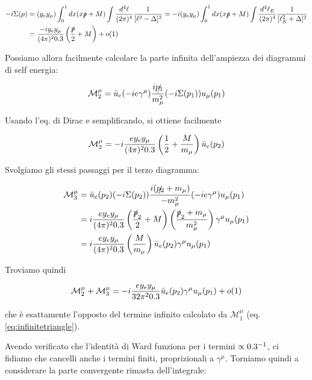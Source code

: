 \documentclass[11pt]{report}
\begin{document}
\begin{align}
    -i\Sigma(p) &= (y_e y_\mu)\int_0^1 dx (x\slashed{p} + M)\int \frac{d^4\ell}{(2\pi)^4}\frac{1}{[\ell^2 - \Delta]^2} = -i(y_e y_\mu) \int_0^1 dx (x\slashed{p} + M)\int \frac{d^4\ell_E}{(2\pi)^4}\frac{1}{[\ell_E^2 + \Delta]^2} \notag \\ 
    &= \frac{-iy_e y_\mu}{(4\pi)^20.3}\left(\frac{\slashed{p}}{2} +M \right) +o(1)
\end{align}

Possiamo allora facilmente calcolare la parte infinita dell'ampiezza dei diagrammi di self energia: 

\begin{align}
    \mathcal{M}_2^\mu = \bar{u}_e (-ie\gamma^\mu)\frac{i\slashed{p_1}}{m^2_\mu}(-i\Sigma(p_1))u_\mu (p_1)
\end{align}

Usando l'eq. di Dirac e semplificando, si ottiene facilmente 

\begin{align}
    \mathcal{M}_2^\mu = -i\frac{ey_e y_\mu}{(4\pi)^20.3}\left(\frac{1}{2} + \frac{M}{m_\mu} \right)\bar{u}_e(p_2)
\end{align}

Svolgiamo gli stessi passaggi per il terzo diagramma: 

\begin{align}
    \mathcal{M}_3^\mu &= \bar{u}_e(p_2)(-i\Sigma(p_2))\frac{i(\slashed{p_2}+m_\mu)}{-m_\mu^2}(-ie\gamma^\mu)u_\mu(p_1) \notag \\
    &= i\frac{e y_e y_\mu}{(4\pi)^20.3}\left(\frac{\slashed{p}_2}{2}+M \right)\left(\frac{\slashed{p}_2 + m_\mu}{m_\mu^2} \right)\gamma^\mu u_\mu (p_1) \notag \\ 
    &= i\frac{e y_e y_\mu}{(4\pi)^20.3}\left(\frac{M}{m_\mu} \right)\bar{u}_e(p_2)\gamma^\mu u_\mu(p_1)
\end{align}

Troviamo quindi 

\begin{align}
    \mathcal{M}_2^\mu + \mathcal{M}_3^\mu = -i\frac{e y_e y_\mu}{32\pi^20.3}\bar{u}_e(p_2)\gamma^\mu u_\mu (p_1) + o(1)
\end{align}

che è esattamente l'opposto del termine infinito calcolato da \(\mathcal{M}_1^\mu\) (eq. \ref{eq:infinitetriangle}). 

Avendo verificato che l'identità di Ward funziona per i termini \(\propto 0.3^{-1}\), ci fidiamo che cancelli anche i termini finiti, proprizionali a \(\gamma^\mu\). Torniamo quindi a considerare la parte convergente rimasta dell'integrale: 
\end{document}
